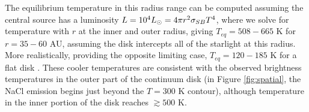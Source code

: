 \documentclass[twocolumn]{aastex62}
\begin{document}
The equilibrium temperature in this radius range can be computed assuming the central
source has a luminosity $L=10^4 L_{\odot} = 4 \pi r^2 \sigma_{SB} T^4 $, where we
solve for temperature with $r$ at the inner and outer radius, giving $T_{eq} =
508-665$ K for $r=35-60$ AU, assuming the disk intercepts all of the starlight 
at this radius.  More realistically, providing the opposite limiting case,
$T_{eq}=120-185$ K for a flat disk \citep{Chiang1997a}.  These cooler temperatures
are consistent with the observed brightness temperatures in the outer
part of the continuum disk (in Figure \ref{fig:spatial}, the NaCl emission
begins just beyond the $T=300$ K contour), although temperature in the inner
portion of the disk reaches $\gtrsim500$ K.
\end{document}
